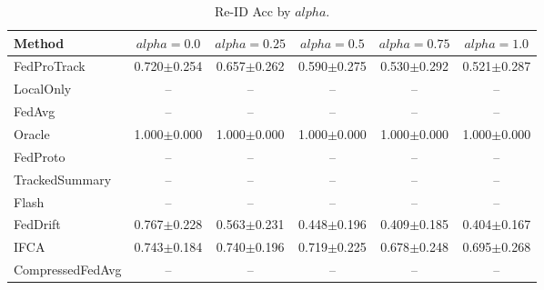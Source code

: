 \begin{table}[t]
\centering
\caption{Re-ID Acc by $alpha$.}
\label{tab:alpha_concept_re_id_accuracy}
\begin{tabular}{lccccc}
\toprule
Method & $alpha=0.0$ & $alpha=0.25$ & $alpha=0.5$ & $alpha=0.75$ & $alpha=1.0$ \\
\midrule
FedProTrack & 0.720$\pm$0.254 & 0.657$\pm$0.262 & 0.590$\pm$0.275 & 0.530$\pm$0.292 & 0.521$\pm$0.287 \\
LocalOnly & -- & -- & -- & -- & -- \\
FedAvg & -- & -- & -- & -- & -- \\
Oracle & 1.000$\pm$0.000 & 1.000$\pm$0.000 & 1.000$\pm$0.000 & 1.000$\pm$0.000 & 1.000$\pm$0.000 \\
FedProto & -- & -- & -- & -- & -- \\
TrackedSummary & -- & -- & -- & -- & -- \\
Flash & -- & -- & -- & -- & -- \\
FedDrift & 0.767$\pm$0.228 & 0.563$\pm$0.231 & 0.448$\pm$0.196 & 0.409$\pm$0.185 & 0.404$\pm$0.167 \\
IFCA & 0.743$\pm$0.184 & 0.740$\pm$0.196 & 0.719$\pm$0.225 & 0.678$\pm$0.248 & 0.695$\pm$0.268 \\
CompressedFedAvg & -- & -- & -- & -- & -- \\
\bottomrule
\end{tabular}
\end{table}